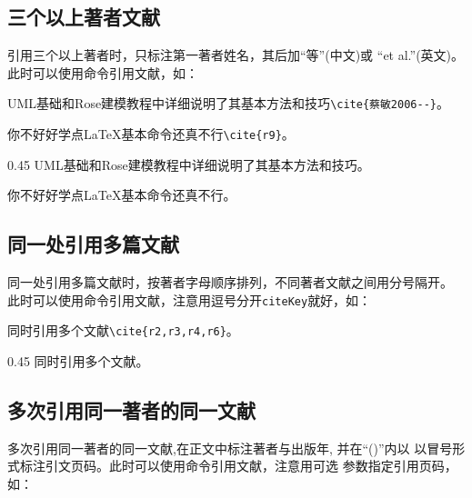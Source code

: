 \subsection{三个以上著者文献}

引用三个以上著者时，只标注第一著者姓名，其后加\enquote{等}(中文)或
\enquote{et al.}(英文)。此时可以使用命令引用文献，如：

\begin{center}
  \begin{minipage}{0.45\textwidth}
    \small
    UML基础和Rose建模教程中详细说明了其基本方法和技巧\verb|\cite{蔡敏2006--}|。

    你不好好学点\LaTeX{}基本命令还真不行\verb|\cite{r9}|。%
  \end{minipage}
  \begin{boxedminipage}{0.45\textwidth}
    \small
    UML基础和Rose建模教程中详细说明了其基本方法和技巧\cite{蔡敏2006--}。

    你不好好学点\LaTeX{}基本命令还真不行\cite{r9}。%
  \end{boxedminipage}
\end{center}

\subsection{同一处引用多篇文献}

同一处引用多篇文献时，按著者字母顺序排列，不同著者文献之间用分号隔开。
此时可以使用命令引用文献，注意用逗号分开\texttt{citeKey}就好，如：

\begin{center}
  \begin{minipage}{0.45\textwidth}
    \small
    同时引用多个文献\verb|\cite{r2,r3,r4,r6}|。%
  \end{minipage}
  \begin{boxedminipage}{0.45\textwidth}
    \small
    同时引用多个文献\cite{r2,r3,r4,r6}。%
  \end{boxedminipage}
\end{center}

\subsection{多次引用同一著者的同一文献}

多次引用同一著者的同一文献,在正文中标注著者与出版年, 并在\enquote{()}内以
以冒号形式标注引文页码。此时可以使用命令引用文献，注意用可选
参数指定引用页码，如：

